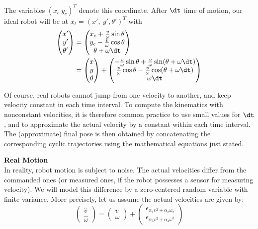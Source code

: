 The variables $(x_c \ y_c)^T$ denote this coordinate. After $\dt$ time of motion, our ideal robot will be at $x_t =  (x', \ y', \theta')^T$ with
\begin{align}
  \begin{pmatrix}x' \\ y' \\ \theta' \end{pmatrix} &= \begin{pmatrix}x_c + \frac{v}{\omega}\sin \theta \\ y_c - \frac{v}{\omega}\cos \theta\\ \theta + \omega \dt \end{pmatrix} \\
                                                   &= \begin{pmatrix}x \\ y \\ \theta \end{pmatrix} + \begin{pmatrix}-\frac{v}{\omega}\sin \theta + \frac{v}{\omega}\sin (\theta + \omega \dt) \\ \frac{v}{\omega}\cos \theta- \frac{v}{\omega}\cos (\theta+\omega \dt )\\ \omega \dt \end{pmatrix}
  \label{eq:ideal motion model}
\end{align}

Of course, real robots cannot jump from one velocity to another, and keep velocity constant in each time interval. To compute the kinematics with nonconstant velocities, it is therefore common practice to use small values for
$\dt$, and to approximate the actual velocity by a constant within each time interval. The (approximate) final pose is then obtained by concatenating the corresponding cyclic trajectories using the mathematical equations just stated.

\textbf{Real Motion}\\

In reality, robot motion is subject to noise. The actual velocities differ from the commanded ones (or measured ones, if the robot possesses a sensor for measuring velocity). We will model this difference by a zero-centered random variable with finite variance. More precisely, let us assume the actual velocities are given by:
\begin{equation}
  \begin{pmatrix}\hat{v} \\ \hat{\omega} \end{pmatrix} = \begin{pmatrix}v \\ \omega \end{pmatrix} + \begin{pmatrix} \epsilon_{\alpha_1v^2 + \alpha_2 \omega_2} \\ \epsilon_{\alpha_3 v^2 + \alpha_4 \omega^2}\end{pmatrix}
  \label{eq:noisy velocities}
\end{equation}

